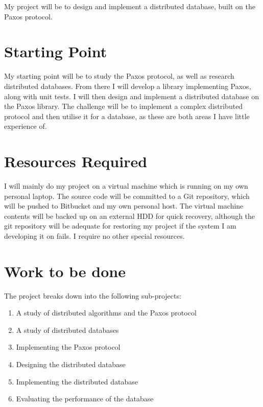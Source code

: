 My project will be to design and implement a distributed database, built on the Paxos protocol.


\section*{Starting Point}

My starting point will be to study the Paxos protocol, as well as research distributed databases.
From there I will develop a library implementing Paxos, along with unit tests. I will then design
and implement a distributed database on the Paxos library. The challenge will be to implement a
complex distributed protocol and then utilise it for a database, as these are both areas I have
little experience of.

\section*{Resources Required}

I will mainly do my project on a virtual machine which is running on my own personal laptop.
The source code will be committed to a Git repository, which will be pushed to Bitbucket and my
own personal host. The virtual machine contents will be backed up on an external HDD for quick
recovery, although the git repository will be adequate for restoring my project if the system I am
developing it on fails.
I require no other special resources.

\section*{Work to be done}

The project breaks down into the following sub-projects:

\begin{enumerate}

\item A study of distributed algorithms and the Paxos protocol

\item A study of distributed databases

\item Implementing the Paxos protocol

\item Designing the distributed database

\item Implementing the distributed database

\item Evaluating the performance of the database

\end{enumerate}


